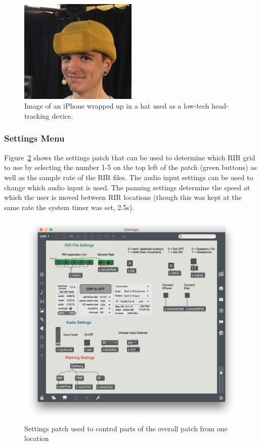 \documentclass[../../main.tex]{subfiles}
\begin{document}
		\begin{figure}
			\centerline{\includegraphics[width=0.5\textwidth]{Sections/Implementation/Max/images/Max/Iteration3/hat_edit.JPG}}
			\caption{Image of an iPhone wrapped up in a hat used as a low-tech head-tracking device.}
			\label{hat}
		\end{figure}

	\subsubsection{Settings Menu}

	Figure~\ref{settings} shows the settings patch that can be used to determine which \ac{RIR} grid to use by selecting the number 1-5 on the top left of the patch (green buttons) as well as the sample rate of the \ac{RIR} files. The audio input settings can be used to change which audio input is used. The panning settings determine the speed at which the user is moved between \ac{RIR} locations (though this was kept at the same rate the system timer was set, 2.5s).

		\begin{figure}[t]
			\centerline{\includegraphics[scale = 0.4]{Sections/Implementation/Max/images/settings.png}}
			\caption{Settings patch used to control parts of the overall patch from one location}
			\label{settings}
		\end{figure}
\end{document}

